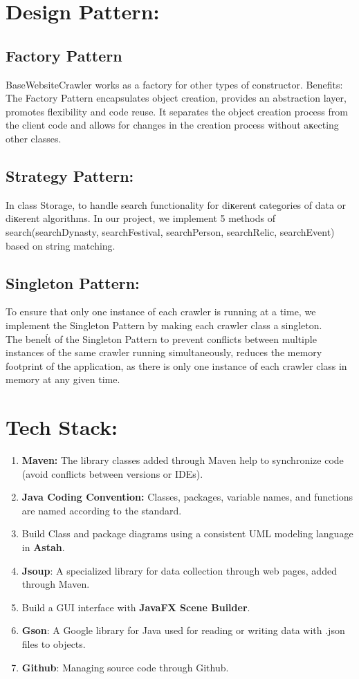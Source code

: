 \documentclass[a4paper,10pt,notitlepage]{article}
\begin{document}
{\section{\textbf{Design Pattern:}}
\subsection{Factory Pattern}
BaseWebsiteCrawler works as a factory for other types of constructor.
Benefits: \\
The Factory Pattern encapsulates object creation, provides an abstraction
layer, promotes flexibility and code reuse. It separates the object creation
process from the client code and allows for changes in the creation process
without aĸecting other classes.
\subsection{Strategy Pattern:}
In class Storage, to handle search functionality for diĸerent categories of data
or diĸerent algorithms. In our project, we implement 5 methods of
search(searchDynasty, searchFestival, searchPerson, searchRelic, searchEvent)
based on string matching.
\subsection{Singleton Pattern:}
To ensure that only one instance of each crawler is running at a time, we
implement the Singleton Pattern by making each crawler class a singleton.\\
The beneĺt of the Singleton Pattern to prevent conflicts between multiple
instances of the same crawler running simultaneously, reduces the memory
footprint of the application, as there is only one instance of each crawler class in
memory at any given time.
\section{\textbf{Tech Stack:}}
\label{sec:TT}
\begin{enumerate}
    \item \textbf{Maven:} The library classes added through Maven help to synchronize code
(avoid conflicts between versions or IDEs).
\item \textbf{Java Coding Convention:} Classes, packages, variable names, and functions
are named according to the standard.
\item  Build Class and package diagrams using a consistent UML modeling language in \textbf{Astah}.
\item \textbf{Jsoup}: A specialized library for data collection through web pages, added
through Maven.
\item Build a GUI interface with \textbf{JavaFX Scene Builder}.
\item \textbf{Gson}: A Google library for Java used for reading or writing data with .json
files to objects.
\item \textbf{Github}: Managing source code through Github.
\end{enumerate}
}
\end{document}
